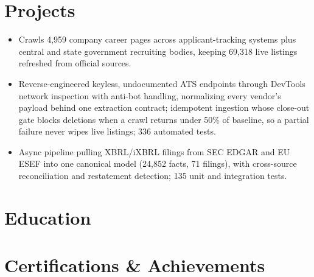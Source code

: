\documentclass[10pt,a4paper]{article}
\begin{document}
\section{Projects}
\begin{itemize}
  \item Crawls 4,959 company career pages across applicant-tracking systems plus central and state government recruiting bodies, keeping 69,318 live listings refreshed from official sources.
  \item Reverse-engineered keyless, undocumented ATS endpoints through DevTools network inspection with anti-bot handling, normalizing every vendor's payload behind one extraction contract; idempotent ingestion whose close-out gate blocks deletions when a crawl returns under 50\% of baseline, so a partial failure never wipes live listings; 336 automated tests.
\end{itemize}

\begin{itemize}
  \item Async pipeline pulling XBRL/iXBRL filings from SEC EDGAR and EU ESEF into one canonical model (24,852 facts, 71 filings), with cross-source reconciliation and restatement detection; 135 unit and integration tests.
\end{itemize}

\section{Education}

\section{Certifications \& Achievements}
\end{document}
